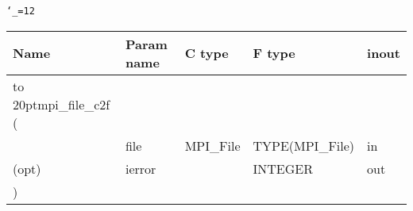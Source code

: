 \begingroup\tt\catcode`\_=12
\begin{tabular}{lllll}
\toprule
\textrm{Name}&\textrm{Param name}&\textrm{C type}&\textrm{F type}&\textrm{inout}\\
\midrule
\hbox to 20pt{mpi_file_c2f (\hss} \\
&file&MPI_File&TYPE(MPI_File)&in\\
(opt)&ierror&&INTEGER&out\\
)\\
\bottomrule
\end{tabular}
\endgroup

